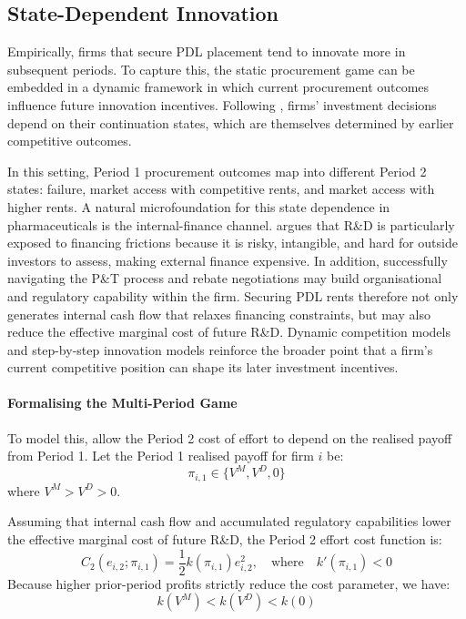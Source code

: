\documentclass[12pt]{article}
\begin{document}
\subsection{State-Dependent Innovation}
Empirically, firms that secure PDL placement tend to innovate more in subsequent periods. To capture this, the static procurement game can be embedded in a dynamic framework in which current procurement outcomes influence future innovation incentives. Following \cite{ericson1995markov}, firms' investment decisions depend on their continuation states, which are themselves determined by earlier competitive outcomes.

In this setting, Period 1 procurement outcomes map into different Period 2 states: failure, market access with competitive rents, and market access with higher rents. A natural microfoundation for this state dependence in pharmaceuticals is the internal-finance channel. \cite{hal2002financing} argues that R\&D is particularly exposed to financing frictions because it is risky, intangible, and hard for outside investors to assess, making external finance expensive. In addition, successfully navigating the P\&T process and rebate negotiations may build organisational and regulatory capability within the firm. Securing PDL rents therefore not only generates internal cash flow that relaxes financing constraints, but may also reduce the effective marginal cost of future R\&D. Dynamic competition models \citep{budd1993model} and step-by-step innovation models \citep{aghion2001competition} reinforce the broader point that a firm's current competitive position can shape its later investment incentives.

\paragraph{Formalising the Multi-Period Game} 
To model this, allow the Period 2 cost of effort to depend on the realised payoff from Period 1. Let the Period 1 realised payoff for firm $i$ be:
\begin{equation}
    \pi_{i,1} \in \{V^M, V^D, 0\}
\end{equation}
where $V^M > V^D > 0$. 

Assuming that internal cash flow and accumulated regulatory capabilities lower the effective marginal cost of future R\&D, the Period 2 effort cost function is:
\begin{equation}
    C_2(e_{i,2} ; \pi_{i,1}) = \frac{1}{2} k(\pi_{i,1}) e_{i,2}^2, \quad \text{where} \quad k'(\pi_{i,1}) < 0
\end{equation}
Because higher prior-period profits strictly reduce the cost parameter, we have:
\begin{equation}
    k(V^M) < k(V^D) < k(0)
\end{equation}
\end{document}

